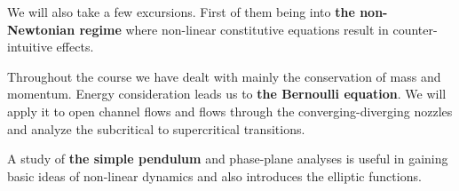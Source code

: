 \documentclass[11pt,a4paper]{article}
\begin{document}
\hfill

We will also take a few excursions. First of them being into \textbf{the non-Newtonian regime} where non-linear constitutive equations result in counter-intuitive effects. 

\hfill

Throughout the course we have dealt with mainly the conservation of mass and momentum. Energy consideration leads us to \textbf{the Bernoulli equation}. We will apply it to open channel flows and flows through the converging-diverging nozzles and analyze the subcritical to supercritical transitions.

\hfill

A study of \textbf{the simple pendulum} and phase-plane analyses is useful in gaining basic ideas of non-linear dynamics and also introduces the elliptic functions.
\end{document}
